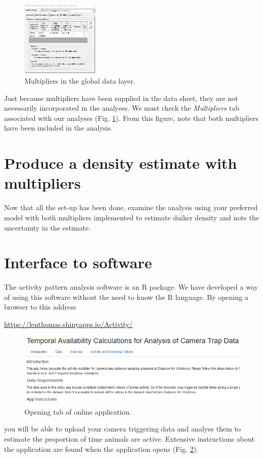\documentclass[a4paper, 10pt]{article}
\begin{document}
\begin{figure}
\includegraphics[width=0.33\textwidth]{images/multiplier-tab.png}
\caption{Multipliers in the global data layer. \label{fig:multtab}}
\vspace{-25pt}
\end{figure}
Just because multipliers have been supplied in the data sheet, they are not necessarily incorporated in the analyses.  We must check the \emph{Multipliers} tab associated with our analyses (Fig. \ref{fig:multtab}).  From this figure, note that both multipliers have been included in the analysis.

\section{Produce a density estimate with multipliers}

Now that all the set-up has been done, examine the analysis using your preferred model with both multipliers implemented to estimate duiker density and note the uncertainty in the estimate.


\section{Interface to \citet{activity_pkg} software}

The activity pattern analysis software \citep{activity_pkg} is an R package.  We have developed a way of using this software without the need to know the R language.  By opening a browser to this address


\url{https://lenthomas.shinyapps.io/Activity/}

\begin{figure}[H]
\includegraphics[width=\textwidth, frame]{images/shiny-tab1.png}
\caption{Opening tab of online application. \label{fig:sh1}}

\end{figure}
you will be able to upload your camera triggering data and analyse them to estimate the proportion of time animals are active.  Extensive instructions about the application are found when the application opens (Fig. \ref{fig:sh1}).
\end{document}
